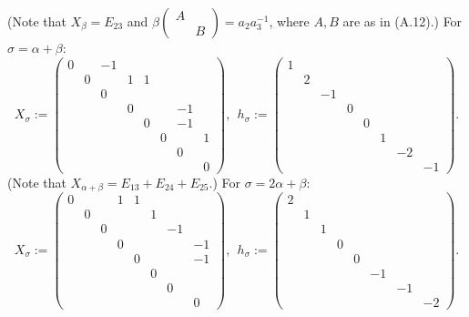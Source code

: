 \documentclass[12pt,letterpaper]{amsart}
\begin{document}
(Note that $X_{\beta} = E_{23}$ and
$\beta\begin{pmatrix} A& \\ &B\end{pmatrix} =a_2a_3^{-1}$, where $A,B$ are as
in (A.12).) For $\sigma = \alpha+\beta$:
\[
X_{\sigma} :=
\begin{pmatrix} 0& &-1& & & & & \\
          &0& &1&1& & & \\
          & &0& & & & & \\
          & & &0& & &-1& \\
          & & & &0& &-1& \\
          & & & & &0& &1\\
          & & & & & &0& \\
          & & & & & & &0
         \end{pmatrix},\ \
h_{\sigma} := \begin{pmatrix} 1& & & & & & & \\
                          &2& & & & & & \\
                          & &-1& & & & & \\
                          & & &0& & & & \\
                          & & & &0& & & \\
                          & & & & &1& & \\
                          & & & & & &-2& \\
                          & & & & & & &-1
                         \end{pmatrix}.
\]
(Note that $X_{\alpha+\beta} = E_{13}+E_{24}+E_{25}.$) For
$\sigma = 2\alpha+\beta$:
\[
X_{\sigma} :=
\begin{pmatrix} 0& & &1&1& & & \\
          &0& & & &1& & \\
          & &0& & & &-1& \\
          & & &0& & & &-1\\
          & & & &0& & &-1\\
          & & & & &0& & \\
          & & & & & &0& \\
          & & & & & & &0
         \end{pmatrix},\ \
h_{\sigma} := \begin{pmatrix} 2& & & & & & & \\
                          &1& & & & & & \\
                          & &1& & & & & \\
                          & & &0& & & & \\
                          & & & &0& & & \\
                          & & & & &-1& & \\
                          & & & & & &-1& \\
                          & & & & & & &-2
                         \end{pmatrix}.
\]
\end{document}

